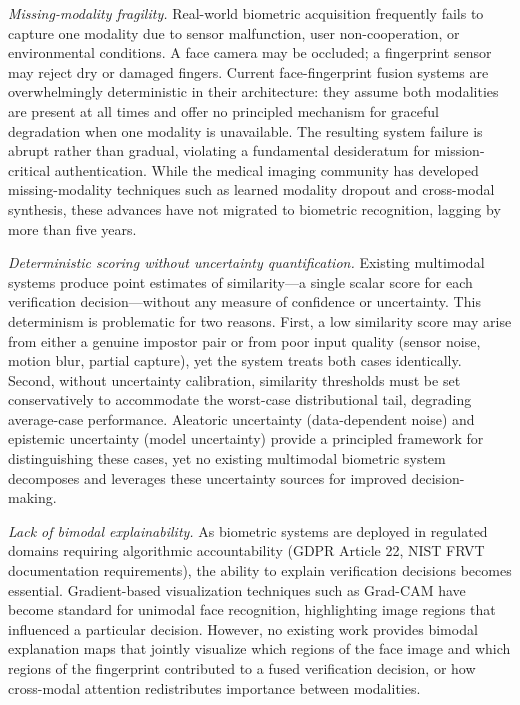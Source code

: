 \documentclass[10pt,journal,compsoc]{IEEEtran}
\begin{document}
\textit{Missing-modality fragility.} Real-world biometric acquisition frequently fails to capture one modality due to sensor malfunction, user non-cooperation, or environmental conditions. A face camera may be occluded; a fingerprint sensor may reject dry or damaged fingers. Current face-fingerprint fusion systems are overwhelmingly deterministic in their architecture: they assume both modalities are present at all times and offer no principled mechanism for graceful degradation when one modality is unavailable. The resulting system failure is abrupt rather than gradual, violating a fundamental desideratum for mission-critical authentication. While the medical imaging community has developed missing-modality techniques such as learned modality dropout and cross-modal synthesis\cite{havaei2016hemis, chen2019robust}, these advances have not migrated to biometric recognition, lagging by more than five years.

\textit{Deterministic scoring without uncertainty quantification.} Existing multimodal systems produce point estimates of similarity---a single scalar score for each verification decision---without any measure of confidence or uncertainty. This determinism is problematic for two reasons. First, a low similarity score may arise from either a genuine impostor pair or from poor input quality (sensor noise, motion blur, partial capture), yet the system treats both cases identically. Second, without uncertainty calibration, similarity thresholds must be set conservatively to accommodate the worst-case distributional tail, degrading average-case performance. Aleatoric uncertainty (data-dependent noise) and epistemic uncertainty (model uncertainty) provide a principled framework for distinguishing these cases, yet no existing multimodal biometric system decomposes and leverages these uncertainty sources for improved decision-making.

\textit{Lack of bimodal explainability.} As biometric systems are deployed in regulated domains requiring algorithmic accountability (GDPR Article 22, NIST FRVT documentation requirements), the ability to explain verification decisions becomes essential. Gradient-based visualization techniques such as Grad-CAM\cite{selvaraju2017grad} have become standard for unimodal face recognition, highlighting image regions that influenced a particular decision. However, no existing work provides bimodal explanation maps that jointly visualize which regions of the face image and which regions of the fingerprint contributed to a fused verification decision, or how cross-modal attention redistributes importance between modalities.
\end{document}
